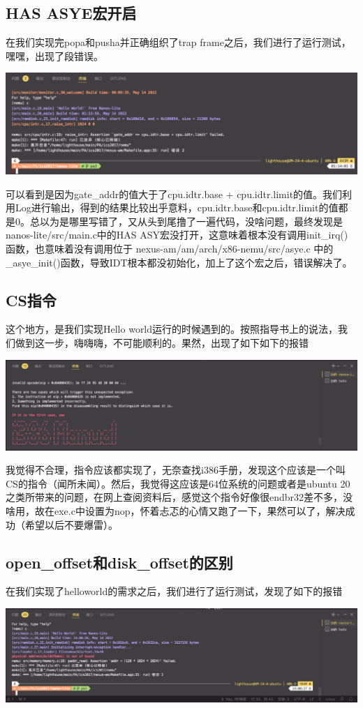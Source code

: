 \documentclass[UTF8,a4paper,10pt]{ctexart}
\begin{document}
\subsection{HAS ASYE宏开启}
在我们实现完popa和pusha并正确组织了trap frame之后，我们进行了运行测试，嘿嘿，出现了段错误。
\begin{center}
  \includegraphics*[scale = 0.3]{pic/报错2}
\end{center}
可以看到是因为gate\_addr的值大于了cpu.idtr.base + cpu.idtr.limit的值。我们利用Log进行输出，得到的结果比较出乎意料，cpu.idtr.base和cpu.idtr.limit的值都是0。总以为是哪里写错了，又从头到尾撸了一遍代码，没啥问题，最终发现是nanos-lite/src/main.c中的HAS ASY宏没打开，这意味着根本没有调用init\_irq()函数，也意味着没有调用位于 nexus-am/am/arch/x86-nemu/src/asye.c 中的\_asye\_init()函数，导致IDT根本都没初始化，加上了这个宏之后，错误解决了。

\subsection{CS指令}
这个地方，是我们实现Hello world运行的时候遇到的。按照指导书上的说法，我们做到这一步，嗨嗨嗨，不可能顺利的。果然，出现了如下如下的报错
\begin{center}
  \includegraphics*[scale = 0.25]{pic/报错3}
\end{center}
我觉得不合理，指令应该都实现了，无奈查找i386手册，发现这个应该是一个叫CS的指令（闻所未闻）。然后，我觉得这应该是64位系统的问题或者是ubuntu 20之类所带来的问题，在网上查阅资料后，感觉这个指令好像很endbr32差不多，没啥用，故在exe.c中设置为nop，怀着忐忑的心情又跑了一下，果然可以了，解决成功（希望以后不要爆雷）。

\subsection{open\_offset和disk\_offset的区别}
在我们实现了helloworld的需求之后，我们进行了运行测试，发现了如下的报错
\begin{center}
  \includegraphics*[scale = 0.25]{pic/报错5}
\end{center}
\end{document}
